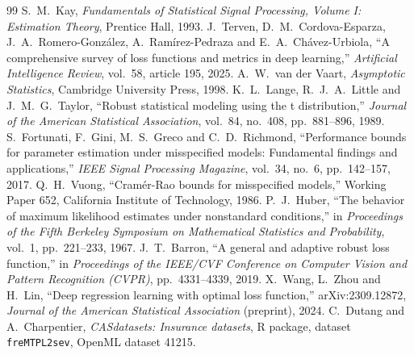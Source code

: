 \documentclass[11pt]{article}
\numberwithin{figure}{section}
\numberwithin{equation}{section}
\begin{document}
\clearpage
{}
\begin{thebibliography}{99}
 S.~M.~Kay, \emph{Fundamentals of Statistical Signal Processing, Volume I: Estimation Theory}, Prentice Hall, 1993.
 J.~Terven, D.~M.~Cordova-Esparza, J.~A.~Romero-Gonz\'alez, A.~Ram\'irez-Pedraza and E.~A.~Ch\'avez-Urbiola, ``A comprehensive survey of loss functions and metrics in deep learning,'' \emph{Artificial Intelligence Review}, vol.~58, article 195, 2025.
 A.~W.~van der Vaart, \emph{Asymptotic Statistics}, Cambridge University Press, 1998.
 K.~L.~Lange, R.~J.~A.~Little and J.~M.~G.~Taylor, ``Robust statistical modeling using the t distribution,'' \emph{Journal of the American Statistical Association}, vol.~84, no.~408, pp.~881--896, 1989.
 S.~Fortunati, F.~Gini, M.~S.~Greco and C.~D.~Richmond, ``Performance bounds for parameter estimation under misspecified models: Fundamental findings and applications,'' \emph{IEEE Signal Processing Magazine}, vol.~34, no.~6, pp.~142--157, 2017.
 Q.~H.~Vuong, ``Cram\'er-Rao bounds for misspecified models,'' Working Paper 652, California Institute of Technology, 1986.
 P.~J.~Huber, ``The behavior of maximum likelihood estimates under nonstandard conditions,'' in \emph{Proceedings of the Fifth Berkeley Symposium on Mathematical Statistics and Probability}, vol.~1, pp.~221--233, 1967.
 J.~T.~Barron, ``A general and adaptive robust loss function,'' in \emph{Proceedings of the IEEE/CVF Conference on Computer Vision and Pattern Recognition (CVPR)}, pp.~4331--4339, 2019.
 X.~Wang, L.~Zhou and H.~Lin, ``Deep regression learning with optimal loss function,'' arXiv:2309.12872, \emph{Journal of the American Statistical Association} (preprint), 2024.
 C.~Dutang and A.~Charpentier, \emph{CASdatasets: Insurance datasets}, R package, dataset \texttt{freMTPL2sev}, OpenML dataset 41215.
\end{thebibliography}
\end{document}

